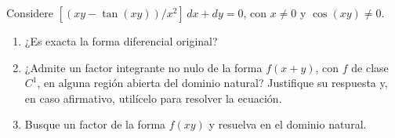 Considere $[(xy-\tan(xy))/x^2]\,dx+dy=0$, con $x\ne0$ y $\cos(xy)\ne0$.

\begin{enumerate}[label=(\alph*),ref=\alph*,leftmargin=*]
\item ¿Es exacta la forma diferencial original?
\item ¿Admite un factor integrante no nulo de la forma $f(x+y)$, con $f$ de clase $C^1$, en alguna región abierta del dominio natural? Justifique su respuesta y, en caso afirmativo, utilícelo para resolver la ecuación.
\item Busque un factor de la forma $f(xy)$ y resuelva en el dominio natural.
\end{enumerate}
